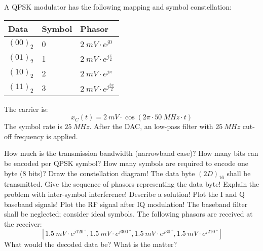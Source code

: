 \begin{question}[subtitle={Constellation diagrams}]
	A QPSK modulator has the following mapping and symbol constellation:
	\begin{table}[H]
		\centering
		\begin{tabular}{|l|l|l|}
			\hline
			Data & Symbol & Phasor \\
			\hline
			\hline
			$(00)_2$ & 0 & $\SI{2}{mV} \cdot e^{j 0}$ \\
			\hline
			$(01)_2$ & 1 & $\SI{2}{mV} \cdot e^{j \frac{\pi}{2}}$ \\
			\hline
			$(10)_2$ & 2 & $\SI{2}{mV} \cdot e^{j \pi}$ \\
			\hline
			$(11)_2$ & 3 & $\SI{2}{mV} \cdot e^{j \frac{3 \pi}{2}}$ \\
			\hline
		\end{tabular}
	\end{table}
	The carrier is:
	\begin{equation*}
		x_C(t) = \SI{2}{mV} \cdot \cos\left(2\pi \cdot \SI{50}{MHz} \cdot t\right)
	\end{equation*}
	The symbol rate is $\SI{25}{MHz}$. After the DAC, an low-pass filter with $\SI{25}{MHz}$ cut-off frequency is applied.
	
	\begin{tasks}
		\task
		How much is the transmission bandwidth (narrowband case)?
		\task
		How many bits can be encoded per QPSK symbol? How many symbols are required to encode one byte (8 bits)?
		\task
		Draw the constellation diagram!
		\task
		The data byte $(2D)_{16}$ shall be transmitted. Give the sequence of phasors representing the data byte!
		\task
		Explain the problem with inter-symbol interference! Describe a solution!
		\task
		Plot the I and Q baseband signals! Plot the RF signal after IQ modulation! The baseband filter shall be neglected; consider ideal symbols.
		\task
		The following phasors are received at the receiver:
		\begin{equation*}
			\left[\SI{1.5}{mV} \cdot e^{j \SI{120}{\degree}}, \SI{1.5}{mV} \cdot e^{j \SI{300}{\degree}}, \SI{1.5}{mV} \cdot e^{j \SI{30}{\degree}}, \SI{1.5}{mV} \cdot e^{j \SI{210}{\degree}}\right]
		\end{equation*}
		What would the decoded data be? What is the matter?
	\end{tasks}
\end{question}

